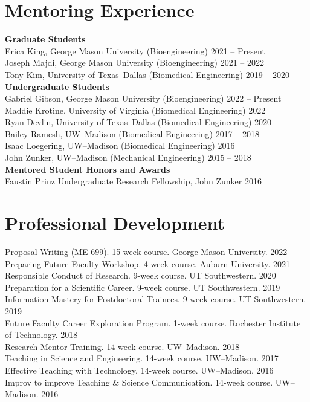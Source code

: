 \documentclass[letterpaper, 10pt]{article}
\begin{document}
\section{Mentoring Experience}
\textbf{Graduate Students}\\
Erica King, George Mason University (Bioengineering) \hfill 2021 -- Present\\
Joseph Majdi, George Mason University (Bioengineering) \hfill 2021 -- 2022\\
Tony Kim, University of Texas--Dallas (Biomedical Engineering) \hfill 2019 -- 2020\\

\textbf{Undergraduate Students}\\
Gabriel Gibson, George Mason University (Bioengineering) \hfill 2022 -- Present\\
Maddie Krotine, University of Virginia (Biomedical Engineering) \hfill 2022\\
Ryan Devlin, University of Texas--Dallas (Biomedical Engineering) \hfill 2020\\
Bailey Ramesh, UW--Madison (Biomedical Engineering) \hfill 2017 -- 2018\\
Isaac Loegering, UW--Madison (Biomedical Engineering) \hfill 2016\\
John Zunker, UW--Madison (Mechanical Engineering) \hfill 2015 -- 2018\\

\textbf{Mentored Student Honors and Awards}\\
Faustin Prinz Undergraduate Research Fellowship, John Zunker \hfill 2016

\section{Professional Development}
Proposal Writing (ME 699). 15-week course. George Mason University. \hfill 2022\\
Preparing Future Faculty Workshop. 4-week course. Auburn University. \hfill 2021\\ 
Responsible Conduct of Research. 9-week course. UT Southwestern. \hfill 2020\\
Preparation for a Scientific Career. 9-week course. UT Southwestern. \hfill 2019\\
Information Mastery for Postdoctoral Trainees. 9-week course. UT Southwestern. \hfill 2019\\
Future Faculty Career Exploration Program. 1-week course. Rochester Institute of Technology. \hfill 2018\\ 
Research Mentor Training. 14-week course. UW--Madison. \hfill 2018\\
Teaching in Science and Engineering. 14-week course. UW--Madison. \hfill 2017\\
Effective Teaching with Technology. 14-week course. UW--Madison. \hfill 2016\\
Improv to improve Teaching \& Science Communication. 14-week course. UW--Madison. \hfill 2016\\
\end{document}
